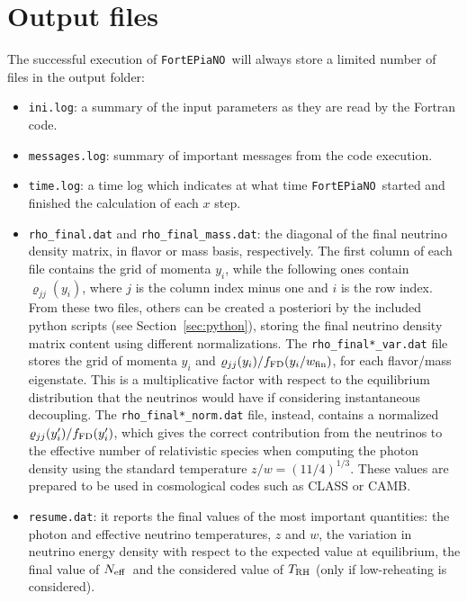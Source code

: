 \documentclass[notitlepage,showpacs,preprintnumbers,amsmath,amssymb,superscriptaddress,prd,onecolumn]{revtex4-1}
\newcommand{\Neff}{\ensuremath{N_{\rm eff}}}
\newcommand{\fortepiano}{\texttt{FortEPiaNO}}
\begin{document}
\section{Output files}
\label{sec:outputs}
The successful execution of \fortepiano\ will always store
a limited number of files in the output folder:
%
\begin{itemize}
%
\item \texttt{ini.log}: a summary of the input parameters as they are read by the Fortran code.
%
\item \texttt{messages.log}: summary of important messages from the code execution.
%
\item \texttt{time.log}: a time log which indicates at what time \fortepiano\ started
and finished the calculation of each $x$ step.
%
\item \texttt{rho\_final.dat} and \texttt{rho\_final\_mass.dat}:
the diagonal of the final neutrino density matrix,
in flavor or mass basis, respectively.
The first column of each file contains the grid of momenta $y_i$,
while the following ones contain $\varrho_{jj}(y_i)$,
where $j$ is the column index minus one and $i$ is the row index.
From these two files, others can be created a posteriori by the included python scripts
(see Section~\ref{sec:python}),
storing the final neutrino density matrix content
using different normalizations.
The \texttt{rho\_final*\_var.dat} file stores the grid of momenta $y_i$ and
$\varrho_{jj}(y_i)/f_{\rm FD}(y_i/w_{\rm fin})$, for each flavor/mass eigenstate.
This is a multiplicative factor with respect to the equilibrium distribution that the neutrinos
would have if considering instantaneous decoupling.
The \texttt{rho\_final*\_norm.dat} file, instead, contains
a normalized $\varrho_{jj}(y'_i)/f_{\rm FD}(y'_i)$, which gives the correct contribution
from the neutrinos to the effective number of relativistic species
when computing the photon density using the standard temperature $z/w=(11/4)^{1/3}$.
These values are prepared to be used in cosmological codes such as CLASS or CAMB.
%
\item \texttt{resume.dat}: it reports the final values of the most important quantities:
the photon and effective neutrino temperatures, $z$ and $w$,
the variation in neutrino energy density
with respect to the expected value at equilibrium,
the final value of \Neff\ and
the considered value of $T_{\rm RH}$ (only if low-reheating is considered).
%
\end{itemize}
\end{document}
